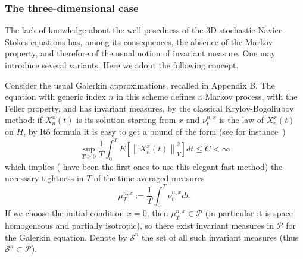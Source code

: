 \documentclass[11pt]{preprint}
\begin{document}
\subsubsection{The three-dimensional case}

\label{subsub3D}

The lack of knowledge about the well posedness of the 3D stochastic
Navier-Stokes equations has, among its consequences, the absence of the Markov
property, and therefore of the usual notion of invariant measure. One may
introduce several variants. Here we adopt the following concept.

Consider the usual Galerkin approximations, recalled in Appendix B. The
equation with generic index $n$ in this scheme defines a Markov process, with
the Feller property, and has invariant measures, by the classical
Krylov-Bogoliubov method: if $X_{n}^{x}\left(  t\right)  $ is its solution
starting from $x$ and $\nu_{t}^{n,x}$ is the law of $X_{n}^{x}\left(
t\right)  $ on $H$, by It\^{o} formula it is easy to get a bound of the form
(see for instance~\cite{FlaGat})
\[
\sup_{T\geq0}\frac{1}{T}\int_{0}^{T}E\left[  \left\|  X_{n}^{x}\left(
t\right)  \right\|  _{V}^{2}\right]  dt\leq C<\infty
\]
which implies (\cite{ChowH} have been the first ones to use this elegant fast
method) the necessary tightness in $T$ of the time averaged measures
\[
\mu_{T}^{n,x}:=\frac{1}{T}\int_{0}^{T}\nu_{t}^{n,x}dt.
\]
If we choose the initial condition $x=0$, then $\mu_{T}^{n,x}\in\mathcal{P} $
(in particular it is space homogeneous and partially isotropic), so there exist
invariant measures in $\mathcal{P}$ for the Galerkin equation. Denote by
$\mathcal{S}^{n}$ the set of all such invariant measures (thus $\mathcal{S}%
^{n}\subset\mathcal{P}$).
\end{document}
